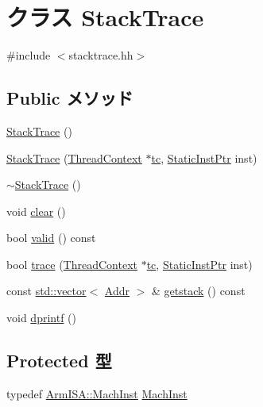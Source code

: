 \hypertarget{classArmISA_1_1StackTrace}{
\section{クラス StackTrace}
\label{classArmISA_1_1StackTrace}
}


{\ttfamily \#include $<$stacktrace.hh$>$}\subsection*{Public メソッド}
\begin{DoxyCompactItemize}
\item 
\hyperlink{classArmISA_1_1StackTrace_a5a9b2e3bba2262e73b20f87325efd063}{StackTrace} ()
\item 
\hyperlink{classArmISA_1_1StackTrace_a7c751415d8c87372fc7d24513309cf1b}{StackTrace} (\hyperlink{classThreadContext}{ThreadContext} $\ast$\hyperlink{classArmISA_1_1StackTrace_a4455a4759e69e5ebe68ae7298cbcc37d}{tc}, \hyperlink{classRefCountingPtr}{StaticInstPtr} inst)
\item 
\hyperlink{classArmISA_1_1StackTrace_adec953886bb73db4f2ec91ed12810135}{$\sim$StackTrace} ()
\item 
void \hyperlink{classArmISA_1_1StackTrace_ac8bb3912a3ce86b15842e79d0b421204}{clear} ()
\item 
bool \hyperlink{classArmISA_1_1StackTrace_a8d985300b138b6c5556ab17ed4df3b38}{valid} () const 
\item 
bool \hyperlink{classArmISA_1_1StackTrace_aabb136846a5e22007e44db846652ddd5}{trace} (\hyperlink{classThreadContext}{ThreadContext} $\ast$\hyperlink{classArmISA_1_1StackTrace_a4455a4759e69e5ebe68ae7298cbcc37d}{tc}, \hyperlink{classRefCountingPtr}{StaticInstPtr} inst)
\item 
const \hyperlink{classstd_1_1vector}{std::vector}$<$ \hyperlink{classm5_1_1params_1_1Addr}{Addr} $>$ \& \hyperlink{classArmISA_1_1StackTrace_aceb93ba31a3756aca859b4643efeeb46}{getstack} () const 
\item 
void \hyperlink{classArmISA_1_1StackTrace_a70fdc8802b54b4244889a2d3553405d5}{dprintf} ()
\end{DoxyCompactItemize}
\subsection*{Protected 型}
\begin{DoxyCompactItemize}
\item 
typedef \hyperlink{namespaceArmISA_a301c22ea09fa33dcfe6ddf22f203699c}{ArmISA::MachInst} \hyperlink{classArmISA_1_1StackTrace_a3a3dd20a48fea6956428bc5567ce9e9d}{MachInst}
\end{DoxyCompactItemize}
